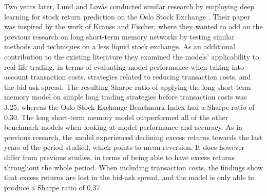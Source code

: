 \indent\newline
Two years later, Lund and Løvås conducted similar research by employing deep learning for stock return prediction on the Oslo Stock Exchange \cite{lund}. Their paper was inspired by the work of Krauss and Fischer, where they wanted to add on the previous research on long short-term memory networks by testing similar methods and techniques on a less liquid stock exchange. As an additional contribution to the existing literature they examined the models' applicability to real-life trading, in terms of evaluating model performance when taking into account transaction costs, strategies related to reducing transaction costs, and the bid-ask spread. The resulting Sharpe ratio of applying the long short-term memory model on simple long trading strategies before transaction costs was 3.25, whereas the Oslo Stock Exchange Benchmark Index had a Sharpe ratio of 0.30. The long short-term memory model outperformed all of the other benchmark models when looking at model performance and accuracy. As in previous research, the model experienced declining excess returns towards the last years of the period studied, which points to mean-reversion. It does however differ from previous studies, in terms of being able to have excess returns throughout the whole period. When including transaction costs, the findings show that excess returns are lost in the bid-ask spread, and the model is only able to produce a Sharpe ratio of 0.37. 




